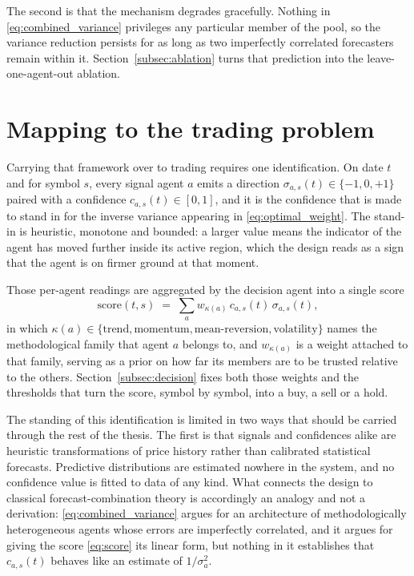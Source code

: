 The second is that the mechanism degrades gracefully. Nothing in \eqref{eq:combined_variance} privileges any particular member of the pool, so the variance reduction persists for as long as two imperfectly correlated forecasters remain within it. Section~\ref{subsec:ablation} turns that prediction into the leave-one-agent-out ablation.

\section{Mapping to the trading problem}\label{sec:mapping}

Carrying that framework over to trading requires one identification. On date $t$ and for symbol $s$, every signal agent $a$ emits a direction $\sigma_{a,s}(t) \in \{-1, 0, +1\}$ paired with a confidence $c_{a,s}(t) \in [0, 1]$, and it is the confidence that is made to stand in for the inverse variance appearing in \eqref{eq:optimal_weight}. The stand-in is heuristic, monotone and bounded: a larger value means the indicator of the agent has moved further inside its active region, which the design reads as a sign that the agent is on firmer ground at that moment.

Those per-agent readings are aggregated by the decision agent into a single score
\begin{equation}
\mathrm{score}(t, s) \;=\; \sum_{a} w_{\kappa(a)} \, c_{a,s}(t) \, \sigma_{a,s}(t),
\label{eq:score}
\end{equation}
in which $\kappa(a) \in \{\text{trend}, \text{momentum}, \text{mean-reversion}, \text{volatility}\}$ names the methodological family that agent $a$ belongs to, and $w_{\kappa(a)}$ is a weight attached to that family, serving as a prior on how far its members are to be trusted relative to the others. Section~\ref{subsec:decision} fixes both those weights and the thresholds that turn the score, symbol by symbol, into a buy, a sell or a hold.

The standing of this identification is limited in two ways that should be carried through the rest of the thesis. The first is that signals and confidences alike are heuristic transformations of price history rather than calibrated statistical forecasts. Predictive distributions are estimated nowhere in the system, and no confidence value is fitted to data of any kind. What connects the design to classical forecast-combination theory is accordingly an analogy and not a derivation: \eqref{eq:combined_variance} argues for an architecture of methodologically heterogeneous agents whose errors are imperfectly correlated, and it argues for giving the score \eqref{eq:score} its linear form, but nothing in it establishes that $c_{a,s}(t)$ behaves like an estimate of $1/\sigma_a^2$.

